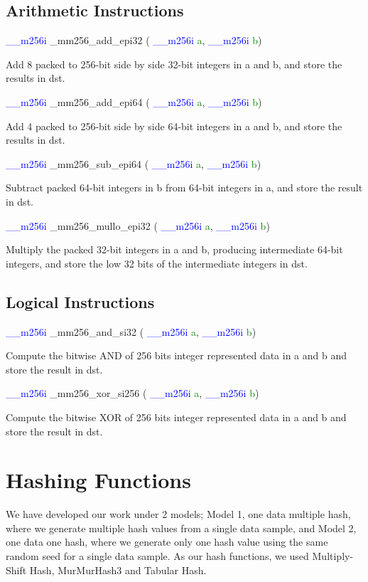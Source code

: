 \documentclass[11pt,oneside,a4paper]{article}
\begin{document}
\subsection{Arithmetic Instructions}
\textcolor{blue}{ \_\_m256i} \_mm256\_add\_epi32 ( \textcolor{blue}{ \_\_m256i} \textcolor{green}{a}, \textcolor{blue}{ \_\_m256i} \textcolor{green}{b})
\par Add 8 packed to 256-bit side by side 32-bit integers in a and b, and store the results in dst.
\par
\textcolor{blue}{ \_\_m256i} \_mm256\_add\_epi64 ( \textcolor{blue}{ \_\_m256i} \textcolor{green}{a}, \textcolor{blue}{ \_\_m256i} \textcolor{green}{b})
\par Add 4 packed to 256-bit side by side 64-bit integers in a and b, and store the results in dst.
\par
\textcolor{blue}{ \_\_m256i} \_mm256\_sub\_epi64 ( \textcolor{blue}{ \_\_m256i} \textcolor{green}{a}, \textcolor{blue}{ \_\_m256i} \textcolor{green}{b})
\par Subtract packed 64-bit integers in b from 64-bit integers in a, and store the result in dst.
\par
\textcolor{blue}{ \_\_m256i} \_mm256\_mullo\_epi32 ( \textcolor{blue}{ \_\_m256i} \textcolor{green}{a}, \textcolor{blue}{ \_\_m256i} \textcolor{green}{b})
\par Multiply the packed 32-bit integers in a and b, producing intermediate 64-bit integers, and store the low 32 bits of the intermediate integers in dst.
\par
\subsection{Logical Instructions}
\textcolor{blue}{ \_\_m256i} \_mm256\_and\_si32 ( \textcolor{blue}{ \_\_m256i} \textcolor{green}{a}, \textcolor{blue}{ \_\_m256i} \textcolor{green}{b})
\par Compute the bitwise AND of 256 bits integer represented data in a and b and store the result in dst.
\par
\textcolor{blue}{ \_\_m256i} \_mm256\_xor\_si256 ( \textcolor{blue}{ \_\_m256i} \textcolor{green}{a}, \textcolor{blue}{ \_\_m256i} \textcolor{green}{b})
\par Compute the bitwise XOR of 256 bits integer represented data in a and b and store the result in dst.
\par

\section{Hashing Functions}
We have developed our work under 2 models; Model 1, one data multiple hash, where we generate multiple hash values from a single data sample, and Model 2, one data one hash, where we generate only one hash value using the same random seed for a single data sample. As our hash functions, we used Multiply-Shift Hash, MurMurHash3  and Tabular Hash. 
\end{document}

